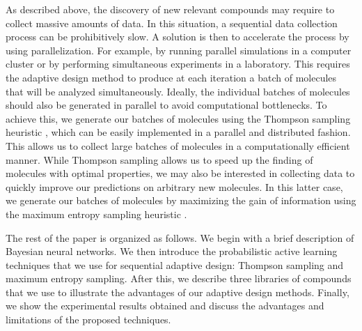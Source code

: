As described above, the discovery of new relevant compounds may require to collect massive amounts of data.
In this situation, a sequential data collection process can be prohibitively slow. A solution is then to accelerate the process by using parallelization.
For example, by running parallel simulations in a computer cluster or by performing simultaneous experiments in a laboratory.
This requires the adaptive design method to produce at each iteration a batch of molecules that will be
analyzed simultaneously. Ideally, the individual batches of molecules should also be generated in parallel to avoid computational bottlenecks. To achieve this, we generate our batches of molecules using the Thompson sampling heuristic \cite{Thompson_1933},
which can be easily implemented in a parallel and distributed fashion. This allows us to collect large
batches of molecules in a computationally efficient manner. While Thompson sampling allows us to speed up
the finding of molecules with optimal properties, we may also be interested in collecting data to quickly
improve our predictions on arbitrary new molecules. In this latter case, we generate our batches
of molecules by maximizing the gain of information using the maximum entropy sampling heuristic \cite{MacKay_1992}.

The rest of the paper is organized as follows. We begin with a brief description of Bayesian neural networks. We then introduce the probabilistic active learning techniques that we use for sequential adaptive design: Thompson sampling and maximum entropy sampling. After this, we describe three libraries of compounds that we use to illustrate the advantages of our adaptive design methods. Finally, we show the experimental results obtained and discuss the advantages and limitations of the proposed techniques.
